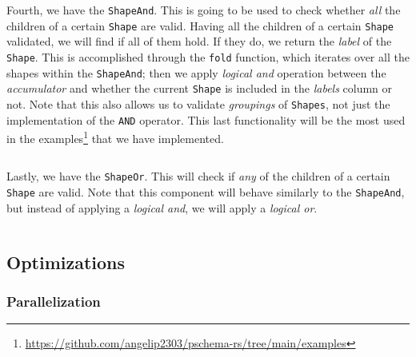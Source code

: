 \begin{code}
    \inputminted{rust}{code/listings/11-14_cardinality.rs}
\end{code}

Fourth, we have the \texttt{ShapeAnd}. This is going to be used to check whether \textit{all} the children of a certain \texttt{Shape} are valid. Having all the children of a certain \texttt{Shape} validated, we will find if all of them hold. If they do, we return the \textit{label} of the \texttt{Shape}. This is accomplished through the \texttt{fold} function, which iterates over all the shapes within the \texttt{ShapeAnd}; then we apply \textit{logical and} operation between the \textit{accumulator} and whether the current \texttt{Shape} is included in the \textit{labels} column or not. Note that this also allows us to validate \textit{groupings} of \texttt{Shapes}, not just the implementation of the \texttt{AND} operator. This last functionality will be the most used in the examples\footnote{\url{https://github.com/angelip2303/pschema-rs/tree/main/examples}} that we have implemented.

\begin{code}
    \inputminted{rust}{code/listings/11-12_and.rs}
\end{code}

Lastly, we have the \texttt{ShapeOr}. This will check if \textit{any} of the children of a certain \texttt{Shape} are valid. Note that this component will behave similarly to the \texttt{ShapeAnd}, but instead of applying a \textit{logical and}, we will apply a \textit{logical or}.

\begin{code}
    \inputminted{rust}{code/listings/11-13_or.rs}
\end{code}

\subsection{Optimizations}

\subsubsection{Parallelization}

